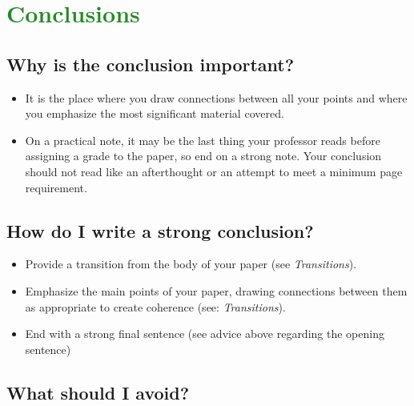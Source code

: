 


\section{\textcolor{ForestGreen}{Conclusions}}  
\subsection{Why is the conclusion important?}

\begin{itemize}
\item It is the place where you draw connections between all your points and where you emphasize the most significant material covered.
 
\item On a practical note, it may be the last thing your professor reads before assigning a grade to the paper, so end on a strong note. Your conclusion should not read like an afterthought or an attempt to meet a minimum page requirement. 
\end{itemize}

\subsection{How do I write a strong conclusion?}
        	
\begin{itemize}

\item Provide a transition from the body of your paper (see \emph{Transitions}).
 
\item Emphasize the main points of your paper, drawing connections between them as appropriate to create coherence (see: \emph{Transitions}).
 
\item End with a strong final sentence (see advice above regarding the opening sentence)

\end{itemize}

\subsection{What should I avoid?}

